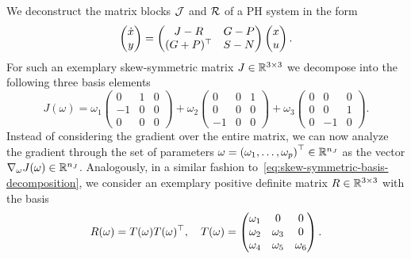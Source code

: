 We deconstruct the matrix blocks $\mathcal{J}$ and $\mathcal{R}$ of a \ac{PH} system in the form
\begin{equation*}
    \begin{pmatrix}
        \dot{x} \\
        y
    \end{pmatrix} = \begin{pmatrix}
        J - R & G - P \\
        (G + P)^{\top} & S - N
    \end{pmatrix} \begin{pmatrix}
        x \\
        u
    \end{pmatrix}.
\end{equation*}
For such an exemplary skew-symmetric matrix $J \in \mathbb{R}^{3 \times 3}$ we decompose into the following three basis elements
\begin{equation}\label{eq:skew-symmetric-basis-decomposition}
    J(\omega) = \omega_1 \begin{pmatrix}
        0 & 1 & 0 \\
        -1 & 0 & 0 \\
        0 & 0 & 0
    \end{pmatrix} + \omega_2 \begin{pmatrix}
        0 & 0 & 1 \\
        0 & 0 & 0 \\
        -1 & 0 & 0
    \end{pmatrix} + \omega_3 \begin{pmatrix}
        0 & 0 & 0 \\
        0 & 0 & 1 \\
        0 & -1 & 0
    \end{pmatrix}.
\end{equation}
Instead of considering the gradient over the entire matrix, we can now analyze the gradient through the set of parameters $\omega = {(\omega_1, \dots, \omega_p)}^{\top} \in \mathbb{R}^{n_J}$ as the vector $\nabla_\omega J(\omega) \in \mathbb{R}^{n_J}$.
Analogously, in a similar fashion to~\eqref{eq:skew-symmetric-basis-decomposition}, we consider an exemplary positive definite matrix $R \in \mathbb{R}^{3 \times 3}$ with the basis
\begin{equation}\label{eq:spsd-basis-decomposition}
    R(\omega) = T(\omega) T(\omega)^{\top},\quad T(\omega) = \begin{pmatrix}
        \omega_1 & 0 & 0 \\
        \omega_2 & \omega_3 & 0 \\
        \omega_4 & \omega_5 & \omega_6
    \end{pmatrix}.
\end{equation}
